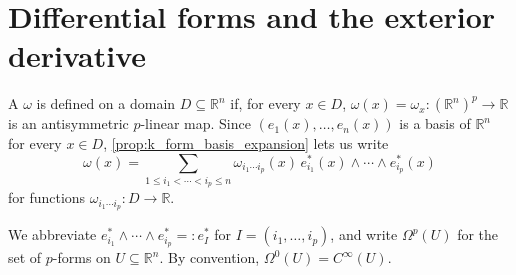 
\section{Differential forms and the exterior derivative}
\label{sec:differential_forms}

\begin{definition}
\label{def:differential_p_form}
A  $\omega$  is defined on a
domain $D \subseteq \mathbb{R}^n$ if, for every $x \in D$, $\omega(x) = \omega_x : (\mathbb{R}^n)^p
\to \mathbb{R}$ is an antisymmetric $p$-linear map. Since $(e_1(x),\ldots,e_n(x))$ is a basis
of $\mathbb{R}^n$ for every $x \in D$, \cref{prop:k_form_basis_expansion} lets us write
\[\omega(x) = \sum_{1\leq i_1<\cdots<i_p\leq n} \omega_{i_1\cdots i_p}(x)\,e_{i_1}^*(x)\wedge
  \cdots\wedge e_{i_p}^*(x)\]
for functions $\omega_{i_1\cdots i_p} : D \to \mathbb{R}$.
\end{definition}

\begin{notation}
We abbreviate $e_{i_1}^*\wedge\cdots\wedge e_{i_p}^* =: e_I^*$ for $I = (i_1,\ldots,i_p)$, and
write $\Omega^p(U)$ for the set of $p$-forms on $U \subseteq \mathbb{R}^n$. By convention,
$\Omega^0(U) = C^\infty(U)$.
\end{notation}

